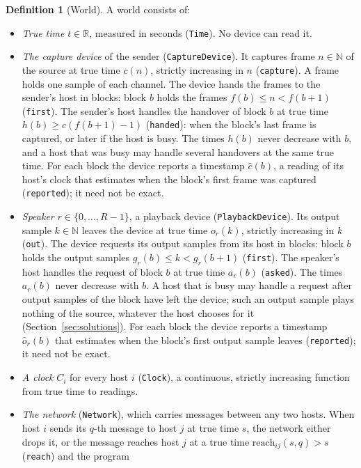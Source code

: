 \documentclass[11pt,a4paper]{article}
\newcommand{\lean}[1]{\texttt{#1}}
\newcommand{\R}{\mathbb{R}}
\newcommand{\N}{\mathbb{N}}
\theoremstyle{definition}
\newtheorem{definition}{Definition}[section]
\begin{document}
\begin{definition}[World]
A world consists of:
\begin{itemize}
\item \emph{True time} $t \in \R$, measured in seconds (\lean{Time}). No
  device can read it.
\item \emph{The capture device} of the sender (\lean{CaptureDevice}). It
  captures frame $n \in \N$ of the source at true time $c(n)$, strictly
  increasing in $n$ (\lean{capture}). A frame holds one sample of each
  channel. The device hands the frames to the sender's host in blocks:
  block $b$ holds the frames $f(b) \le n < f(b+1)$ (\lean{first}). The
  sender's host handles the handover of block $b$ at true time
  $h(b) \ge c(f(b+1)-1)$ (\lean{handed}): when the block's last frame is
  captured, or later if the host is busy. The times $h(b)$ never decrease
  with $b$, and a host that was busy may handle several handovers at the
  same true time. For each
  block the device reports a timestamp $\hat c(b)$, a reading of its host's
  clock that estimates when the block's first frame was captured
  (\lean{reported}); it need not be exact.
\item \emph{Speaker} $r \in \{0,\dots,R-1\}$, a playback device
  (\lean{PlaybackDevice}). Its output sample $k \in \N$ leaves the device at
  true time $o_r(k)$, strictly increasing in $k$ (\lean{out}). The device
  requests its output samples from its host in blocks: block $b$ holds the
  output samples $g_r(b) \le k < g_r(b+1)$ (\lean{first}). The speaker's
  host handles the request of block $b$ at true time $a_r(b)$
  (\lean{asked}). The times $a_r(b)$ never decrease with $b$. A host that
  is busy may handle a request after output samples of the block have left
  the device; such an output sample plays nothing of the source, whatever
  the host chooses for it (Section~\ref{sec:solutions}). For each block the
  device reports a timestamp $\hat o_r(b)$ that estimates when the block's
  first output sample leaves (\lean{reported}); it need not be exact.
\item \emph{A clock} $C_i$ for every host $i$ (\lean{Clock}), a continuous,
  strictly increasing function from true time to readings.
\item \emph{The network} (\lean{Network}), which carries messages between
  any two hosts. When host $i$ sends its $q$-th message to host $j$ at true
  time $s$, the network either drops it, or the message reaches host $j$ at
  a true time $\mathrm{reach}_{ij}(s,q) > s$ (\lean{reach}) and the program

\end{itemize}
\end{definition}
\end{document}
